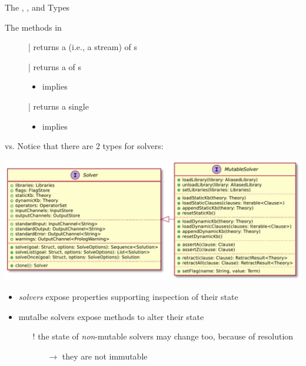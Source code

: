 \documentclass[handout]{beamer}
\begin{document}
\begin{frame}[allowframebreaks]{The , , and  Types}
    \begin{block}{The  methods in }
        \begin{description}
            \item[] | returns a  (i.e., a stream) of s
            \item[] | returns a  of s 
            \begin{itemize}\small
                \item implies 
            \end{itemize} 
            \item[] | returns a single  
            \begin{itemize}\small
                \item implies 
            \end{itemize} 
        \end{description}
    \end{block}

    \framebreak


\end{frame}

\begin{frame}[allowframebreaks]{ vs. }
    Notice that there are 2 types for solvers:
    \begin{center}
        \includegraphics[width=.8\linewidth]{img/solve-mutable.pdf}
    \end{center}
    \begin{itemize}\small
        \item \emph{solvers} expose properties supporting \alert{inspection} of their state
        \item \alert{mutalbe} solvers expose methods to \alert{alter} their state
        \begin{itemize}
            \item[!] the state of \emph{non}-mutable solvers may change too, because of resolution
            \begin{itemize}
                \item[$\rightarrow$] they are \alert{not} immutable
            \end{itemize} 
        \end{itemize}
    \end{itemize}
\end{frame}
\end{document}
